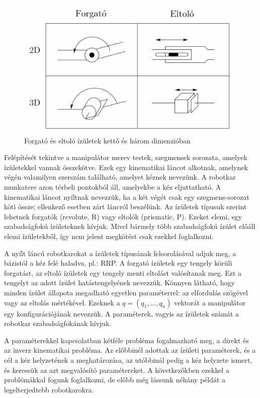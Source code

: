 \documentclass[12pt,a4paper]{report}
\theoremstyle{remark}
\theoremstyle{definition}
\begin{document}
\begin{figure}[b]
\centering
\includegraphics[width=0.6\linewidth]{./images/Joint_types}
\caption{Forgató és eltoló ízületek kettő és három dimenzióban}
\end{figure}

Felépítését tekintve a manipulátor merev testek, szegmensek sorozata, amelyek ízületekkel vannak összekötve. Ezek 
egy kinematikai láncot alkotnak, amelynek végén valamilyen szerszám található, amelyet kéznek nevezünk. A robotkar 
munkatere azon térbeli pontokból áll, amelyekbe a kéz eljuttatható. A kinematikai láncot nyíltnak nevezzük, ha a két 
végét csak egy szegmens-sorozat köti össze; ellenkező esetben zárt láncról beszélünk. Az ízületek típusuk szerint 
lehetnek forgatók (revolute, R) vagy eltolók (prismatic, P). Ezeket elemi, egy szabadságfokú ízületeknek hívjuk.  
Mivel bármely több szabadságfokú ízület előáll elemi ízületekből, így nem jelent megkötést csak ezekkel foglalkozni.

A nyílt láncú robotkarokat a ízületek típusának felsorolásával adjuk meg, a bázistól a kéz felé haladva, pl.: RRP. A 
forgató ízületek egy tengely körüli forgatást, az eltoló ízületek egy tengely menti eltolást valósítanak meg. Ezt a 
tengelyt az adott ízület hatástengelyének nevezzük. Könnyen látható, hogy minden ízület állapota megadható egyetlen 
paraméterrel: az elfordulás szögével vagy az eltolás mértékével. Ezeknek a $q = (q_1, \ldots, q_n)$ vektorát a 
manipulátor egy konfigurációjának nevezzük. A paraméterek, vagyis az ízületek számát a robotkar szabadságfokának 
hívjuk.

A paraméterekkel kapcsolatban kétféle probléma fogalmazható meg, a direkt és az inverz kinematikai probléma. Az 
előbbinél adottak az ízületi paraméterek, és a cél a kéz helyzetének a meghatározása, az utóbbinál pedig a kéz 
helyzete ismert, és keressük az azt megvalósító paramétereket. A következőkben ezekkel a problémákkal fogunk 
foglalkozni, de előbb még lássunk néhány példát a legelterjedtebb robotkarokra.
\end{document}
